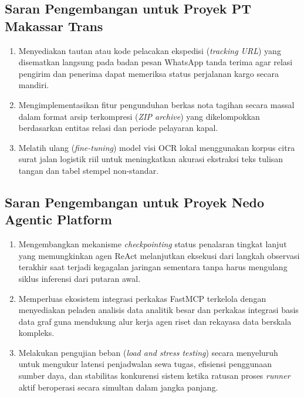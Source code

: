 \subsection{Saran Pengembangan untuk Proyek PT Makassar Trans}

\begin{enumerate}[label=\arabic*., leftmargin=*, itemsep=0pt]
  \item Menyediakan tautan atau kode pelacakan ekspedisi (\textit{tracking URL}) yang disematkan langsung pada badan pesan WhatsApp tanda terima agar relasi pengirim dan penerima dapat memeriksa status perjalanan kargo secara mandiri.
  \item Mengimplementasikan fitur pengunduhan berkas nota tagihan secara massal dalam format arsip terkompresi (\textit{ZIP archive}) yang dikelompokkan berdasarkan entitas relasi dan periode pelayaran kapal.
  \item Melatih ulang (\textit{fine-tuning}) model visi OCR lokal menggunakan korpus citra surat jalan logistik riil untuk meningkatkan akurasi ekstraksi teks tulisan tangan dan tabel stempel non-standar.
\end{enumerate}

\subsection{Saran Pengembangan untuk Proyek Nedo Agentic Platform}

\begin{enumerate}[label=\arabic*., leftmargin=*, itemsep=0pt]
  \item Mengembangkan mekanisme \textit{checkpointing} status penalaran tingkat lanjut yang memungkinkan agen ReAct melanjutkan eksekusi dari langkah observasi terakhir saat terjadi kegagalan jaringan sementara tanpa harus mengulang siklus inferensi dari putaran awal.
  \item Memperluas ekosistem integrasi perkakas FastMCP terkelola dengan menyediakan peladen analisis data analitik besar dan perkakas integrasi basis data graf guna mendukung alur kerja agen riset dan rekayasa data berskala kompleks.
  \item Melakukan pengujian beban (\textit{load and stress testing}) secara menyeluruh untuk mengukur latensi penjadwalan sewa tugas, efisiensi penggunaan sumber daya, dan stabilitas konkurensi sistem ketika ratusan proses \textit{runner} aktif beroperasi secara simultan dalam jangka panjang.
\end{enumerate}
